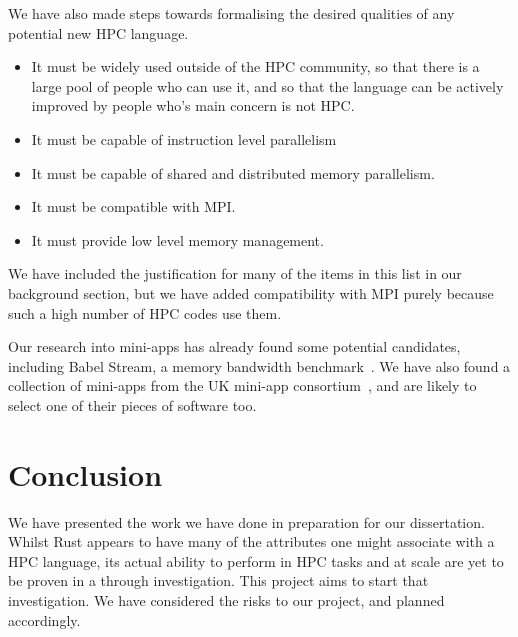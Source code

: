 \documentclass{report}[a4]
\begin{document}
We have also made steps towards formalising the desired qualities of any potential new HPC language.

\begin{itemize}
  \item It must be widely used outside of the HPC community, so that there is a large pool of people who can use it, and so that the language can be actively improved by people who's main concern is not HPC.
  \item It must be capable of instruction level parallelism
  \item It must be capable of shared and distributed memory parallelism.
  \item It must be compatible with MPI.
  \item It must provide low level memory management.
\end{itemize}

We have included the justification for many of the items in this list in our background section, but we have added compatibility with MPI purely because such a high number of HPC codes use them.

Our research into mini-apps has already found some potential candidates, including Babel Stream, a memory bandwidth benchmark~\cite{raman2017improving}. We have also found a collection of mini-apps from the UK mini-app consortium~\cite{MAC}, and are likely to select one of their pieces of software too.

\chapter{Conclusion}
We have presented the work we have done in preparation for our dissertation. Whilst Rust appears to have many of the attributes one might associate with a HPC language, its actual ability to perform in HPC tasks and at scale are yet to be proven in a through investigation. This project aims to start that investigation. We have considered the risks to our project, and planned accordingly.



\end{document}
